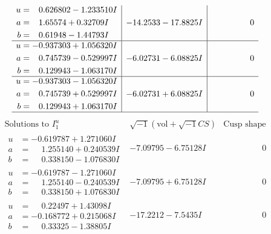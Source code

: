 \documentclass[1p]{elsarticle_modified}
\theoremstyle{definition}
\newcommand{\I}{\sqrt{-1}}
\begin{document}
$$\begin{array}{c|c|c}
\begin{aligned}
u &= \phantom{-}0.626802 - 1.233510 I \\
a &= \phantom{-}1.65574 + 0.32709 I \\
b &= \phantom{-}0.61948 - 1.44793 I\end{aligned}
 & -14.2533 - 17.8825 I & \phantom{-0.000000 } 0 \\ \hline\begin{aligned}
u &= -0.937303 + 1.056320 I \\
a &= \phantom{-}0.745739 - 0.529997 I \\
b &= \phantom{-}0.129943 - 1.063170 I\end{aligned}
 & -6.02731 - 6.08825 I & \phantom{-0.000000 } 0 \\ \hline\begin{aligned}
u &= -0.937303 - 1.056320 I \\
a &= \phantom{-}0.745739 + 0.529997 I \\
b &= \phantom{-}0.129943 + 1.063170 I\end{aligned}
 & -6.02731 + 6.08825 I & \phantom{-0.000000 } 0\\
 \hline 
 \end{array}$$\newpage$$\begin{array}{c|c|c}  
\text{Solutions to }I^u_{1}& \I (\text{vol} + \sqrt{-1}CS) & \text{Cusp shape}\\
 \hline 
\begin{aligned}
u &= -0.619787 + 1.271060 I \\
a &= \phantom{-}1.255140 + 0.240539 I \\
b &= \phantom{-}0.338150 - 1.076830 I\end{aligned}
 & -7.09795 - 6.75128 I & \phantom{-0.000000 } 0 \\ \hline\begin{aligned}
u &= -0.619787 - 1.271060 I \\
a &= \phantom{-}1.255140 - 0.240539 I \\
b &= \phantom{-}0.338150 + 1.076830 I\end{aligned}
 & -7.09795 + 6.75128 I & \phantom{-0.000000 } 0 \\ \hline\begin{aligned}
u &= \phantom{-}0.22497 + 1.43098 I \\
a &= -0.168772 + 0.215068 I \\
b &= \phantom{-}0.33325 - 1.38805 I\end{aligned}
 & -17.2212 - 7.5435 I & \phantom{-0.000000 } 0 \\ \hline\begin{aligned}

\end{aligned}
\end{array}$$
\end{document}
